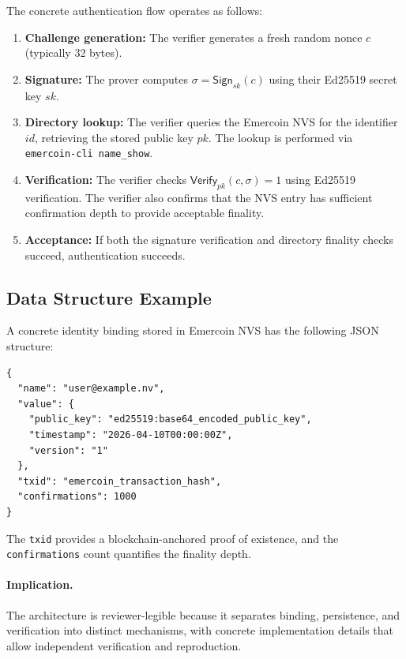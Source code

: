 \documentclass[11pt,a4paper]{article}
\begin{document}
The concrete authentication flow operates as follows:

\begin{enumerate}[leftmargin=*]
  \item \textbf{Challenge generation:} The verifier generates a fresh random nonce $c$ (typically 32 bytes).
  
  \item \textbf{Signature:} The prover computes $\sigma = \mathsf{Sign}_{sk}(c)$ using their Ed25519 secret key $sk$.
  
  \item \textbf{Directory lookup:} The verifier queries the Emercoin NVS for the identifier $id$, retrieving the stored public key $pk$. The lookup is performed via \texttt{emercoin-cli name\_show}.
  
  \item \textbf{Verification:} The verifier checks $\mathsf{Verify}_{pk}(c,\sigma) = 1$ using Ed25519 verification. The verifier also confirms that the NVS entry has sufficient confirmation depth to provide acceptable finality.
  
  \item \textbf{Acceptance:} If both the signature verification and directory finality checks succeed, authentication succeeds.
\end{enumerate}

\subsection{Data Structure Example}

A concrete identity binding stored in Emercoin NVS has the following JSON structure:

\begin{verbatim}
{
  "name": "user@example.nv",
  "value": {
    "public_key": "ed25519:base64_encoded_public_key",
    "timestamp": "2026-04-10T00:00:00Z",
    "version": "1"
  },
  "txid": "emercoin_transaction_hash",
  "confirmations": 1000
}
\end{verbatim}

The \texttt{txid} provides a blockchain-anchored proof of existence, and the \texttt{confirmations} count quantifies the finality depth.

\paragraph{Implication.} The architecture is reviewer-legible because it separates binding, persistence, and verification into distinct mechanisms, with concrete implementation details that allow independent verification and reproduction.
\end{document}
